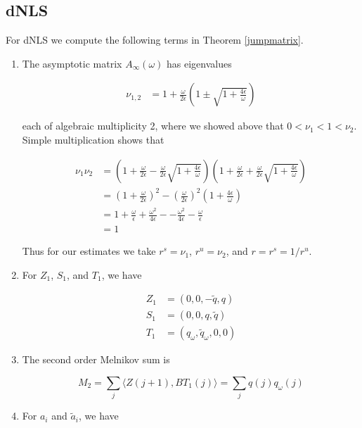\documentclass[12pt]{article}
\begin{document}
\subsection{dNLS}

For dNLS we compute the following terms in Theorem \ref{jumpmatrix}.

\begin{enumerate}
\item The asymptotic matrix $A_\infty(\omega)$ has eigenvalues

\begin{align*}
\nu_{1,2} &= 1 + \frac{\omega}{2 \epsilon} \left( 1 \pm \sqrt{1 + \frac{4 \epsilon}{\omega}} \right)
\end{align*}

each of algebraic multiplicity 2, where we showed above that $0 < \nu_1 < 1 < \nu_2$. Simple multiplication shows that

\begin{align*}
\nu_1 \nu_2 &= \left( 1 + \frac{\omega}{2 \epsilon} - \frac{\omega}{2 \epsilon} \sqrt{1 + \frac{4 \epsilon}{\omega}} \right)\left( 1 + \frac{\omega}{2 \epsilon} + \frac{\omega}{2 \epsilon} \sqrt{1 + \frac{4 \epsilon}{\omega}} \right)\\
&= \left( 1 + \frac{\omega}{2 \epsilon} \right)^2 
- \left( \frac{\omega}{2 \epsilon} \right)^2 \left( 1 + \frac{4 \epsilon}{\omega} \right) \\
&= 1 + \frac{\omega}{\epsilon} + \frac{\omega^2}{4 \epsilon} -- \frac{\omega^2}{4 \epsilon} - \frac{\omega}{\epsilon} \\
&= 1
\end{align*}

Thus for our estimates we take $r^s = \nu_1$, $r^u = \nu_2$, and $r = r^s = 1/r^u$.

\item For $Z_1$, $S_1$, and $T_1$, we have

\begin{align*}
Z_1 &= (0, 0, -\tilde{q}, q) \\
S_1 &= (0, 0, q, \tilde{q}) \\
T_1 &= (q_\omega, \tilde{q}_\omega, 0, 0)
\end{align*}

\item The second order Melnikov sum is

\[
M_2 = \sum_j \langle Z(j+1), B T_1(j) \rangle = \sum_j q(j) q_\omega(j)
\]

\item For $a_i$ and $\tilde{a}_i$, we have


\end{enumerate}
\end{document}
